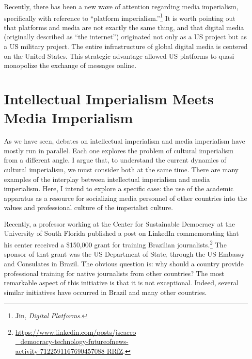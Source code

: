 \documentclass{tufte-handout}
\begin{document}
Recently, there has been a new wave of attention regarding media
imperialism, specifically with reference to ``platform
imperialism.''\footnote{Jin, \emph{Digital Platforms.}} It is worth
pointing out that platforms and media are not exactly the same thing,
and that digital media (originally described as ``the internet'')
originated not only as a US project but as a US military project. The
entire infrastructure of global digital media is centered on the United
States. This strategic advantage allowed US platforms to
quasi-monopolize the exchange of messages online.

\vspace{2em}

\hypertarget{intellectual-imperialism-meets-media-imperialism}{%
\section{Intellectual Imperialism Meets Media
Imperialism}\label{intellectual-imperialism-meets-media-imperialism}}

As we have seen, debates on intellectual imperialism and media
imperialism have mostly run in parallel. Each one explores the problem
of cultural imperialism from a different angle. I argue that, to
understand the current dynamics of cultural imperialism, we must
consider both at the same time. There are many examples of the interplay
between intellectual imperialism and media imperialism. Here, I intend
to explore a specific case: the use of the academic apparatus as a
resource for socializing media personnel of other countries into the
values and professional culture of the imperialist culture.

Recently, a professor working at the Center for Sustainable Democracy at
the University of South Florida published a post on LinkedIn
commemorating that his center received a \$150,000 grant for training
Brazilian journalists.\footnote{\href{https://www.linkedin.com/posts/jscacco\_democracy-technology-futureofnews-activity-7122591167690457088-RRfZ}{https://www.linkedin.com/posts/jscacco\\\noindent\_democracy-technology-futureofnews-\\\noindent activity-7122591167690457088-RRfZ}.}
The sponsor of that grant was the US Department of State, through the US
Embassy and Consulates in Brazil. The obvious question is: why should a
country provide professional training for native journalists from other
countries? The most remarkable aspect of this initiative is that it is
not exceptional. Indeed, several similar initiatives have occurred in
Brazil and many other countries.
\end{document}

